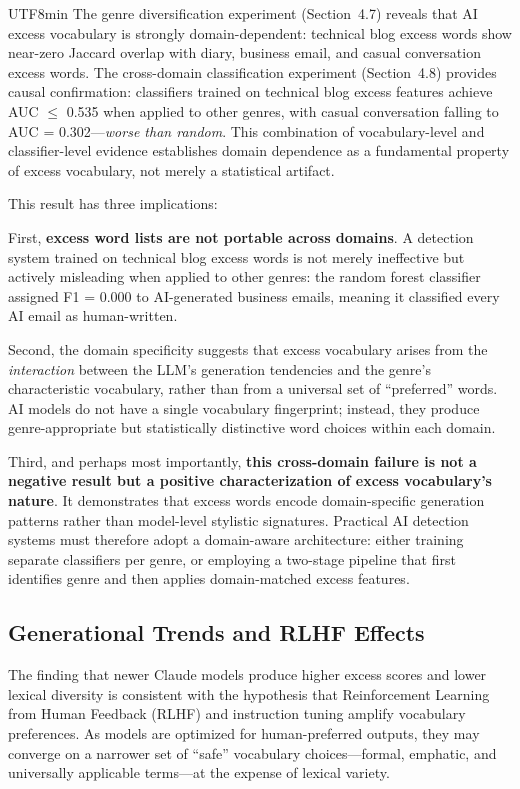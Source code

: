 \documentclass[11pt,a4paper]{article}
\begin{document}
\begin{CJK}{UTF8}{min}
The genre diversification experiment (Section~4.7) reveals that AI excess vocabulary is strongly domain-dependent: technical blog excess words show near-zero Jaccard overlap with diary, business email, and casual conversation excess words. The cross-domain classification experiment (Section~4.8) provides causal confirmation: classifiers trained on technical blog excess features achieve AUC $\leq$ 0.535 when applied to other genres, with casual conversation falling to AUC = 0.302---\emph{worse than random}. This combination of vocabulary-level and classifier-level evidence establishes domain dependence as a fundamental property of excess vocabulary, not merely a statistical artifact.

This result has three implications:

First, \textbf{excess word lists are not portable across domains}. A detection system trained on technical blog excess words is not merely ineffective but actively misleading when applied to other genres: the random forest classifier assigned F1 = 0.000 to AI-generated business emails, meaning it classified every AI email as human-written.

Second, the domain specificity suggests that excess vocabulary arises from the \emph{interaction} between the LLM's generation tendencies and the genre's characteristic vocabulary, rather than from a universal set of ``preferred'' words. AI models do not have a single vocabulary fingerprint; instead, they produce genre-appropriate but statistically distinctive word choices within each domain.

Third, and perhaps most importantly, \textbf{this cross-domain failure is not a negative result but a positive characterization of excess vocabulary's nature}. It demonstrates that excess words encode domain-specific generation patterns rather than model-level stylistic signatures. Practical AI detection systems must therefore adopt a domain-aware architecture: either training separate classifiers per genre, or employing a two-stage pipeline that first identifies genre and then applies domain-matched excess features.

\subsection{Generational Trends and RLHF Effects}

The finding that newer Claude models produce higher excess scores and lower lexical diversity is consistent with the hypothesis that Reinforcement Learning from Human Feedback (RLHF) and instruction tuning amplify vocabulary preferences. As models are optimized for human-preferred outputs, they may converge on a narrower set of ``safe'' vocabulary choices---formal, emphatic, and universally applicable terms---at the expense of lexical variety.


\end{CJK}
\end{document}
